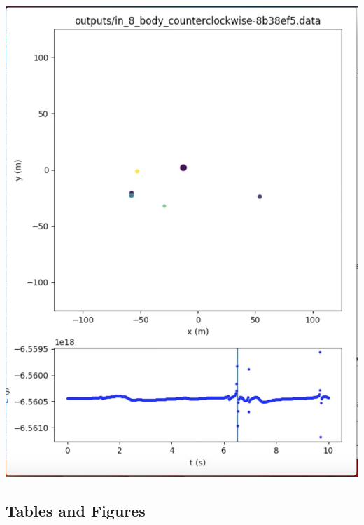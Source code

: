 \documentclass{beamer}
\begin{document}
\includegraphics[width=\textwidth]{energy_anomaly}

\subsection{Tables and Figures}
\end{document}
